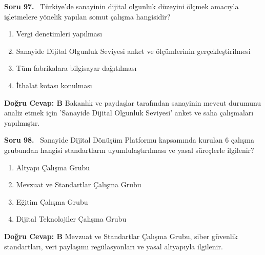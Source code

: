 \documentclass[11pt,a4paper,openany]{book}
\begin{document}
\needspace{5cm}
\vspace{8pt}
\noindent\textbf{\large\sffamily Soru 97.} \ Türkiye'de sanayinin dijital olgunluk düzeyini ölçmek amacıyla işletmelere yönelik yapılan somut çalışma hangisidir?
\begin{enumerate}[label=\Alph*), leftmargin=25pt, topsep=4pt, itemsep=2pt]
    \item Vergi denetimleri yapılması
    \item Sanayide Dijital Olgunluk Seviyesi anket ve ölçümlerinin gerçekleştirilmesi
    \item Tüm fabrikalara bilgisayar dağıtılması
    \item İthalat kotası konulması
\end{enumerate}
\vspace{4pt}
\begin{tcolorbox}[title=Cevap ve Açıklama, colback=gray!3!white, colframe=primarycolor!90!black, arc=2mm, fonttitle=\bfseries\sffamily, top=6pt, bottom=6pt]
    \textbf{Doğru Cevap: B}
    \vspace{2pt}
    Bakanlık ve paydaşlar tarafından sanayinin mevcut durumunu analiz etmek için 'Sanayide Dijital Olgunluk Seviyesi' anket ve saha çalışmaları yapılmıştır.
\end{tcolorbox}
\vspace{10pt}

\needspace{5cm}
\vspace{8pt}
\noindent\textbf{\large\sffamily Soru 98.} \ Sanayide Dijital Dönüşüm Platformu kapsamında kurulan 6 çalışma grubundan hangisi standartların uyumlulaştırılması ve yasal süreçlerle ilgilenir?
\begin{enumerate}[label=\Alph*), leftmargin=25pt, topsep=4pt, itemsep=2pt]
    \item Altyapı Çalışma Grubu
    \item Mevzuat ve Standartlar Çalışma Grubu
    \item Eğitim Çalışma Grubu
    \item Dijital Teknolojiler Çalışma Grubu
\end{enumerate}
\vspace{4pt}
\begin{tcolorbox}[title=Cevap ve Açıklama, colback=gray!3!white, colframe=primarycolor!90!black, arc=2mm, fonttitle=\bfseries\sffamily, top=6pt, bottom=6pt]
    \textbf{Doğru Cevap: B}
    \vspace{2pt}
    Mevzuat ve Standartlar Çalışma Grubu, siber güvenlik standartları, veri paylaşımı regülasyonları ve yasal altyapıyla ilgilenir.
\end{tcolorbox}
\vspace{10pt}
\end{document}
